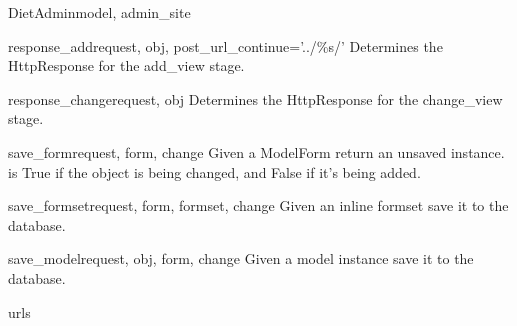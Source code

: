 \documentclass[letterpaper,10pt,english]{sphinxmanual}
\begin{document}
\begin{classdesc}{DietAdmin}{model, admin\_site}
\hypertarget{data.admin.DietAdmin.response_add}{}\begin{methoddesc}{response\_add}{request, obj, post\_url\_continue='../\%s/'}
Determines the HttpResponse for the add\_view stage.
\end{methoddesc}

\hypertarget{data.admin.DietAdmin.response_change}{}\begin{methoddesc}{response\_change}{request, obj}
Determines the HttpResponse for the change\_view stage.
\end{methoddesc}

\hypertarget{data.admin.DietAdmin.save_form}{}\begin{methoddesc}{save\_form}{request, form, change}
Given a ModelForm return an unsaved instance.  is True if
the object is being changed, and False if it's being added.
\end{methoddesc}

\hypertarget{data.admin.DietAdmin.save_formset}{}\begin{methoddesc}{save\_formset}{request, form, formset, change}
Given an inline formset save it to the database.
\end{methoddesc}

\hypertarget{data.admin.DietAdmin.save_model}{}\begin{methoddesc}{save\_model}{request, obj, form, change}
Given a model instance save it to the database.
\end{methoddesc}

\hypertarget{data.admin.DietAdmin.urls}{}\begin{memberdesc}{urls}\end{memberdesc}
\end{classdesc}
\end{document}
